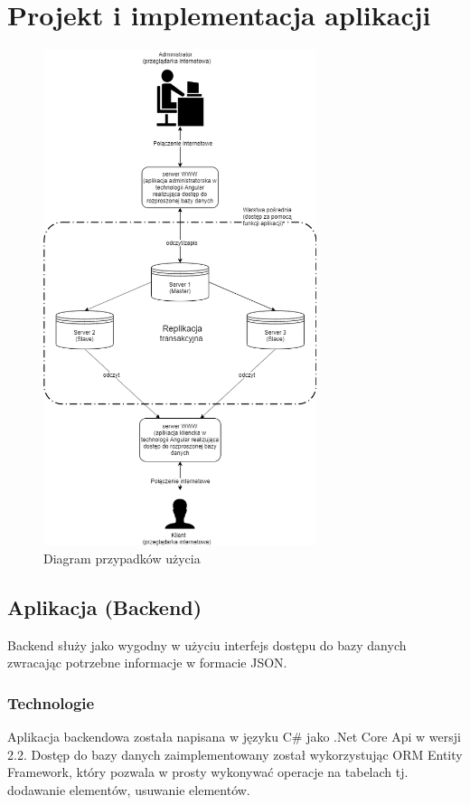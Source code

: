 \documentclass{article}
\begin{document}
\section{Projekt i implementacja aplikacji}
			\begin{figure}[hbt!]
				\includegraphics[width=8cm]{Files/Pictures/SystemStruct}
				\centering
				\caption{Diagram przypadków użycia}
			\end{figure}
			\newpage
	\subsection{Aplikacja (Backend)}
	Backend służy jako wygodny w użyciu interfejs dostępu do bazy danych zwracając potrzebne informacje w formacie JSON.
		\subsubsection{Technologie}
		Aplikacja backendowa została napisana w języku C\# jako .Net Core Api w wersji 2.2. Dostęp do bazy danych zaimplementowany został wykorzystując ORM Entity Framework, który pozwala w prosty wykonywać operacje na tabelach tj. dodawanie elementów, usuwanie elementów.
\end{document}
